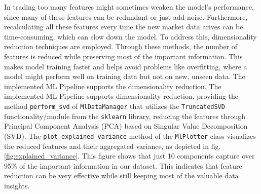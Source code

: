 In trading too many features might sometimes weaken the model's performance, since many of these features can be redundant or just add noise.
Furthermore, recalculating all these features every time the new market data arives can be time-consuming, which can slow down the model.
To address this, dimensionality reduction techniques are employed. Through these methods, the number of features is reduced while preserving most of the important information. This makes model training faster and helps avoid problems like overfitting, where a model might perform well on training data but not on new, unseen data.
The implemented ML Pipeline supports the dimensionality reduction. The implemented ML Pipeline supports dimensionality reduction, providing the method \texttt{perform\_svd} of \texttt{MlDataManager} that utilizes the \texttt{TruncatedSVD} functionality/module from the \texttt{sklearn} library,
reducing the features through Principal Component Analysis (PCA) based on Singular Value Decomposition (SVD). The \texttt{plot\_explained\_variance} method of the \texttt{MlPlotter} class visualizes the reduced features and their aggregated variance,
as depicted in fig.  \ref{fig:explained_variance}. This figure shows that just 10 components capture over 95\% of the important information in our dataset. This indicates that feature reduction can be very effective while still keeping most of the valuable data insights.

